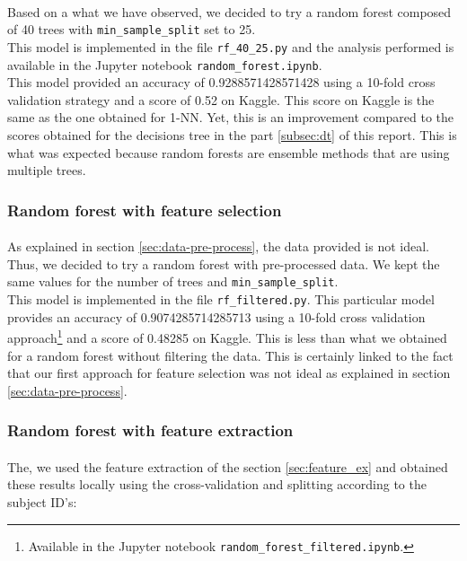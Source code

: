 \documentclass[a4paper, 11pt, oneside]{article}
\begin{document}
\paragraph{}Based on a what we have observed, we decided to try a random forest composed of 40 trees with \texttt{min\_sample\_split} set to 25.\\
This model is implemented in the file \texttt{rf\_40\_25.py} and the analysis performed is available in the Jupyter notebook \texttt{random\_forest.ipynb}.\\
This model provided an accuracy of 0.9288571428571428 using a 10-fold cross validation strategy and a score of 0.52 on Kaggle. This score on Kaggle is the same as the one obtained for 1-NN. Yet, this is an improvement compared to the scores obtained for the decisions tree in the part \ref{subsec:dt} of this report. This is what was expected because random forests are ensemble methods that are using multiple trees.

\subsubsection{Random forest with feature selection} \label{subsubsec:rfFiltered}
\paragraph{}As explained in section \ref{sec:data-pre-process}, the data provided is not ideal. Thus, we decided to try a random forest with pre-processed data. We kept the same values for the number of trees and \texttt{min\_sample\_split}.\\
This model is implemented in the file \texttt{rf\_filtered.py}. This particular model provides an accuracy of 0.9074285714285713 using a 10-fold cross validation approach\footnote{Available in the Jupyter notebook \texttt{random\_forest\_filtered.ipynb}.} and a score of 0.48285 on Kaggle. This is less than what we obtained for a random forest without filtering the data. This is certainly linked to the fact that our first approach for feature selection was not ideal as explained in section \ref{sec:data-pre-process}.

\subsubsection{Random forest with feature extraction} \label{subsubsec:rf_feature_extraction}
\paragraph{}The, we used the feature extraction of the section \ref{sec:feature_ex} and obtained these results locally using the cross-validation and splitting according to the subject ID's: 
\end{document}
